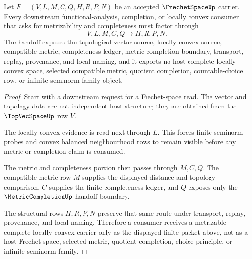 \begin{theorem}
\label{thm:frechet-space-metrizable-complete-handoff}
Let $F=(V,L,M,C,Q,H,R,P,N)$ be an accepted $\FrechetSpaceUp$ carrier. Every downstream functional-analysis, completion, or locally convex consumer that asks for metrizability and completeness must factor through
$$
V,L,M,C,Q \longmapsto H,R,P,N .
$$
The handoff exposes the topological-vector source, locally convex source, compatible metric, completeness ledger, metric-completion boundary, transport, replay, provenance, and local naming, and it exports no host complete locally convex space, selected compatible metric, quotient completion, countable-choice row, or infinite seminorm-family object.
\end{theorem}
\begin{proof}
Start with a downstream request for a Frechet-space read. The vector and topology data are not independent host structure; they are obtained from the $\TopVecSpaceUp$ row $V$.

The locally convex evidence is read next through $L$. This forces finite seminorm probes and convex balanced neighbourhood rows to remain visible before any metric or completion claim is consumed.

The metric and completeness portion then passes through $M,C,Q$. The compatible metric row $M$ supplies the displayed distance and topology comparison, $C$ supplies the finite completeness ledger, and $Q$ exposes only the $\MetricCompletionUp$ handoff boundary.

The structural rows $H,R,P,N$ preserve that same route under transport, replay, provenance, and local naming. Therefore a consumer receives a metrizable complete locally convex carrier only as the displayed finite packet above, not as a host Frechet space, selected metric, quotient completion, choice principle, or infinite seminorm family.
\end{proof}



